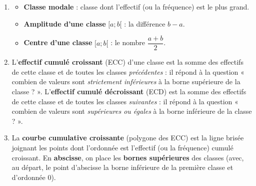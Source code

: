 \documentclass[11pt]{article}
\begin{document}
\begin{corrige}
\begin{enumerate}
\item \begin{itemize}
\item \textbf{Classe modale} : classe dont l'effectif (ou la fréquence) est le plus grand.
\item \textbf{Amplitude d'une classe} $[a ; b[$ : la différence $b-a$.
\item \textbf{Centre d'une classe} $[a ; b[$ : le nombre $\dfrac{a+b}{2}$.
\end{itemize}
\item L'\textbf{effectif cumulé croissant} (ECC) d'une classe est la somme des effectifs de cette classe et de toutes les classes \emph{précédentes} : il répond à la question « combien de valeurs sont \emph{strictement inférieures} à la borne supérieure de la classe ? ». L'\textbf{effectif cumulé décroissant} (ECD) est la somme des effectifs de cette classe et de toutes les classes \emph{suivantes} : il répond à la question « combien de valeurs sont \emph{supérieures ou égales} à la borne inférieure de la classe ? ».
\item La \textbf{courbe cumulative croissante} (polygone des ECC) est la ligne brisée joignant les points dont l'ordonnée est l'effectif (ou la fréquence) cumulé croissant. En \textbf{abscisse}, on place les \textbf{bornes supérieures} des classes (avec, au départ, le point d'abscisse la borne inférieure de la première classe et d'ordonnée $0$).
\end{enumerate}
\end{corrige}
\end{document}
